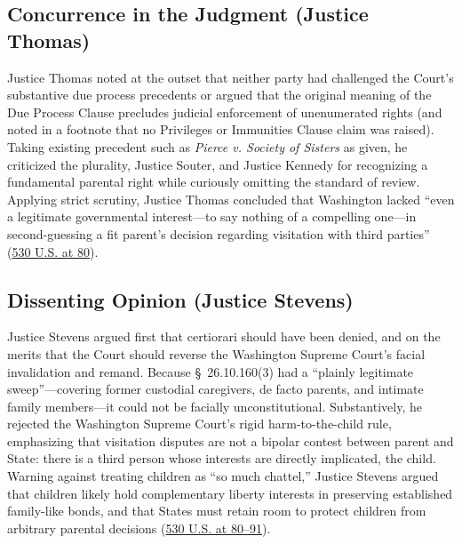 \documentclass[12pt]{article}
\begin{document}
\subsection{Concurrence in the Judgment (Justice Thomas)}
Justice Thomas noted at the outset that neither party had challenged the Court's substantive due process precedents or argued that the original meaning of the Due Process Clause precludes judicial enforcement of unenumerated rights (and noted in a footnote that no Privileges or Immunities Clause claim was raised). Taking existing precedent such as \textit{Pierce v. Society of Sisters} as given, he criticized the plurality, Justice Souter, and Justice Kennedy for recognizing a fundamental parental right while curiously omitting the standard of review. Applying strict scrutiny, Justice Thomas concluded that Washington lacked ``even a legitimate governmental interest---to say nothing of a compelling one---in second-guessing a fit parent's decision regarding visitation with third parties'' (\href{https://www.law.cornell.edu/supremecourt/text/99-138}{530 U.S. at 80}).

\subsection{Dissenting Opinion (Justice Stevens)}
Justice Stevens argued first that certiorari should have been denied, and on the merits that the Court should reverse the Washington Supreme Court's facial invalidation and remand. Because \S\ 26.10.160(3) had a ``plainly legitimate sweep''---covering former custodial caregivers, de facto parents, and intimate family members---it could not be facially unconstitutional. Substantively, he rejected the Washington Supreme Court's rigid harm-to-the-child rule, emphasizing that visitation disputes are not a bipolar contest between parent and State: there is a third person whose interests are directly implicated, the child. Warning against treating children as ``so much chattel,'' Justice Stevens argued that children likely hold complementary liberty interests in preserving established family-like bonds, and that States must retain room to protect children from arbitrary parental decisions (\href{https://www.law.cornell.edu/supremecourt/text/99-138}{530 U.S. at 80--91}).
\end{document}
